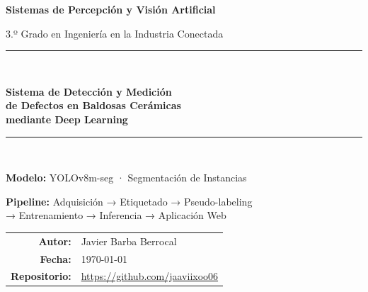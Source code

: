 \documentclass[12pt,a4paper]{article}
\begin{document}
\begin{titlepage}
  \centering
  \vspace*{1.5cm}
  {\LARGE\bfseries Sistemas de Percepción y Visión Artificial\par}
  \vspace{0.6cm}
  {\Large 3.º Grado en Ingeniería en la Industria Conectada\par}
  \vspace{2cm}
  \rule{\linewidth}{1.5pt}\\[0.4cm]
  {\huge\bfseries Sistema de Detección y Medición\\[0.3cm]
   de Defectos en Baldosas Cerámicas\\[0.3cm]
   mediante Deep Learning\par}
  \rule{\linewidth}{1.5pt}\\[1cm]
  {\large\textbf{Modelo:} YOLOv8m-seg · Segmentación de Instancias\par}
  \vspace{0.5cm}
  {\large\textbf{Pipeline:} Adquisición → Etiquetado → Pseudo-labeling\\
   → Entrenamiento → Inferencia → Aplicación Web\par}
  \vfill
  \begin{tabular}{rl}
    \textbf{Autor:}      & Javier Barba Berrocal \\[4pt]
    \textbf{Fecha:}      & \today \\[4pt]
    \textbf{Repositorio:} & \url{https://github.com/jaaviixoo06}\\
  \end{tabular}
  \vspace{1.5cm}
\end{titlepage}
\end{document}
